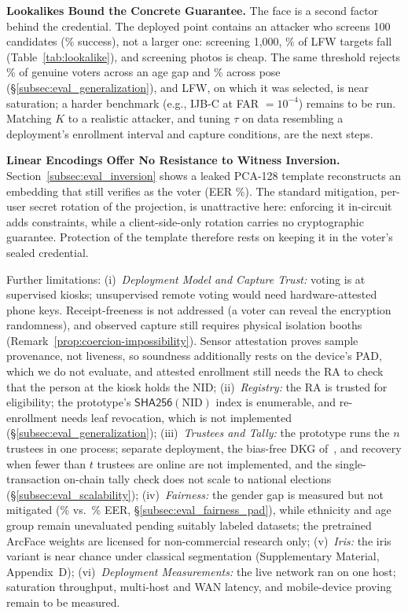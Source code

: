 \documentclass[10pt,letterpaper,journal]{IEEEtran}
\begin{document}
\textbf{Lookalikes Bound the Concrete Guarantee.} The face is a second factor behind the credential. The deployed point contains an attacker who screens 100 candidates (\nLookLfwHundred\% success), not a larger one: screening 1,000, \nLookLfwThousand\% of LFW targets fall (Table~\ref{tab:lookalike}), and screening photos is cheap. The same threshold rejects \nCalfwFrr\% of genuine voters across an age gap and \nCplfwFrr\% across pose (\S\ref{subsec:eval_generalization}), and LFW, on which it was selected, is near saturation; a harder benchmark (e.g., IJB-C at FAR $= 10^{-4}$) remains to be run. Matching $K$ to a realistic attacker, and tuning $\tau$ on data resembling a deployment's enrollment interval and capture conditions, are the next steps.

\textbf{Linear Encodings Offer No Resistance to Witness Inversion.} Section~\ref{subsec:eval_inversion} shows a leaked PCA-128 template reconstructs an embedding that still verifies as the voter (EER \nInvEer\%). The standard mitigation, per-user secret rotation of the projection, is unattractive here: enforcing it in-circuit adds constraints, while a client-side-only rotation carries no cryptographic guarantee. Protection of the template therefore rests on keeping it in the voter's sealed credential.

Further limitations: (i)~\emph{Deployment Model and Capture Trust:} voting is at supervised kiosks; unsupervised remote voting would need hardware-attested phone keys. Receipt-freeness is not addressed (a voter can reveal the encryption randomness), and observed capture still requires physical isolation booths (Remark~\ref{prop:coercion-impossibility}). Sensor attestation proves sample provenance, not liveness, so soundness additionally rests on the device's PAD, which we do not evaluate, and attested enrollment still needs the RA to check that the person at the kiosk holds the NID; (ii)~\emph{Registry:} the RA is trusted for eligibility; the prototype's $\mathsf{SHA256}(\text{NID})$ index is enumerable, and re-enrollment needs leaf revocation, which is not implemented (\S\ref{subsec:eval_generalization}); (iii)~\emph{Trustees and Tally:} the prototype runs the $n$ trustees in one process; separate deployment, the bias-free DKG of~\cite{Gennaro2007}, and recovery when fewer than $t$ trustees are online are not implemented, and the single-transaction on-chain tally check does not scale to national elections (\S\ref{subsec:eval_scalability}); (iv)~\emph{Fairness:} the gender gap is measured but not mitigated (\nMaleEer\% vs.\ \nFemaleEer\% EER, \S\ref{subsec:eval_fairness_pad}), while ethnicity and age group remain unevaluated pending suitably labeled datasets; the pretrained ArcFace weights are licensed for non-commercial research only; (v)~\emph{Iris:} the iris variant is near chance under classical segmentation (Supplementary Material, Appendix~D); (vi)~\emph{Deployment Measurements:} the live network ran on one host; saturation throughput, multi-host and WAN latency, and mobile-device proving remain to be measured.
\end{document}
